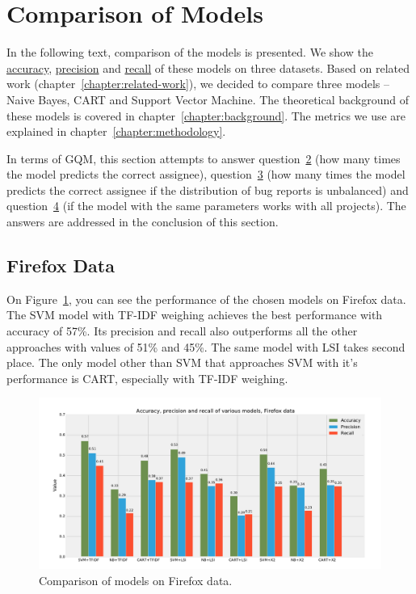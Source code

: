 \section{Comparison of Models}

In the following text, comparison of the models is presented. We show the \hyperlink{metric:a}{accuracy}, \hyperlink{metric:p}{precision} and \hyperlink{metric:r}{recall} of these models on three datasets. Based on related work (chapter~\ref{chapter:related-work}), we decided to compare three models -- Naive Bayes, CART and Support Vector Machine. The theoretical background of these models is covered in chapter~\ref{chapter:background}. The metrics we use are explained in chapter~\ref{chapter:methodology}.

In terms of GQM, this section attempts to answer question~\hyperlink{question:2}{2} (how many times the model predicts the correct assignee), question~\hyperlink{question:3}{3} (how many times the model predicts the correct assignee if the distribution of bug reports is unbalanced) and question~\hyperlink{question:4}{4} (if the model with the same parameters works with all projects). The answers are addressed in the conclusion of this section.

\subsection{Firefox Data}

On Figure~\ref{fig:results.models.firefox}, you can see the performance of the chosen models on Firefox data. The SVM model with TF-IDF weighing achieves the best performance with accuracy of 57\%. Its precision and recall also outperforms all the other approaches with values of 51\% and 45\%. The same model with LSI takes second place. The only model other than SVM that approaches SVM with it's performance is CART, especially with TF-IDF weighing.

\begin{figure}[htbp]
    \centering
        \includegraphics[width=\textwidth]{./images/comparison_of_models/firefox.pdf}
    \caption{Comparison of models on Firefox data.}
    \label{fig:results.models.firefox}
\end{figure}

